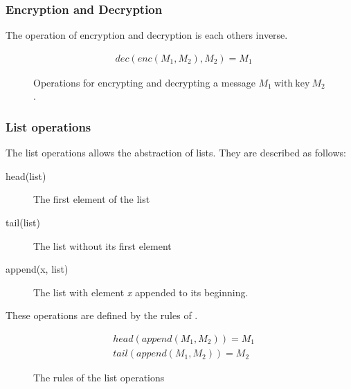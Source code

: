 \subsubsection{Encryption and Decryption}
The operation of encryption and decryption is each others inverse.
\begin{figure}[h]
    \begin{align*}
        &dec(enc(M_1, M_2),M_2) = M_1 \tag{Decrypt}
    \end{align*}
    \caption{Operations for encrypting and decrypting a message $M_1\ \mathrm{with\ key}\ M_2$.}
\end{figure}
\FloatBarrier

\subsubsection{List operations}

The list operations allows the abstraction of lists. They are described as follows:

\begin{description}
	\item[head(list)] The first element of the list
	\item[tail(list)] The list without its first element
	\item[append(x, list)] The list with element \textit{x} appended to its beginning.
\end{description}

These operations are defined by the rules of .

\begin{figure}[h]
	\begin{align*}
		&head(append(M_1, M_2)) = M_1 \tag{Head} \\
		&tail(append(M_1, M_2)) = M_2 \tag{Tail}
	\end{align*}
	\caption{The rules of the list operations}
	\label{listoprules}
\end{figure}

\FloatBarrier


